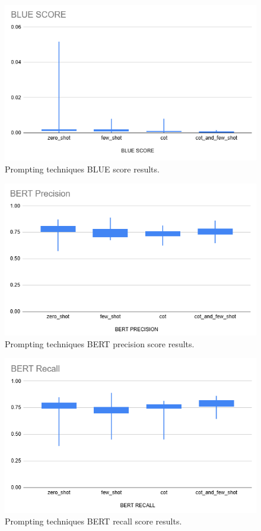 \documentclass[fleqn,moreauthors,10pt]{ds_report}
\begin{document}
\begin{figure}[h!]
  \centering
  \includegraphics[scale=0.4]{fig/blue_score.png}
  \caption{Prompting techniques BLUE score results.}
  \label{fig:blue}
\end{figure}
\begin{figure}[h!]
  \centering
  \includegraphics[scale=0.4]{fig/bert_precision.png}
  \caption{Prompting techniques BERT precision score results.}
  \label{fig:bert_pre}
\end{figure}
\begin{figure}[h!]
  \centering
  \includegraphics[scale=0.4]{fig/bert_recall.png}
  \caption{Prompting techniques BERT recall score results.}
  \label{fig:bert_recall}
\end{figure}
\end{document}

